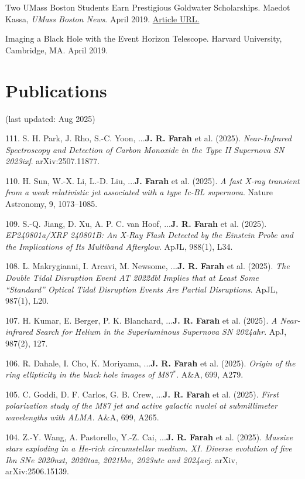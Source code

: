\documentclass[margin,line]{res}
\begin{document}
\begin{resume}
Two UMass Boston Students Earn Prestigious Goldwater Scholarships. Maedot Kassa, \textit{UMass Boston News}. April 2019. {\color{blue}\href{https://www.umb.edu/news/detail/two_umass_boston_students_earn_prestigious_goldwater_scholarships}{Article URL.}}


Imaging a Black Hole with the Event Horizon Telescope. Harvard University, Cambridge, MA. April
2019.




\vspace{+.4cm}
\section{\sc Publications} 
\label{sec:publications}

(last updated: Aug 2025)

111. S. H. Park, J. Rho, S.-C. Yoon, ...\textbf{J. R. Farah} et al. (2025). \textit{Near-Infrared Spectroscopy and Detection of Carbon Monoxide in the Type II Supernova SN 2023ixf}. arXiv:2507.11877.

110. H. Sun, W.-X. Li, L.-D. Liu, ...\textbf{J. Farah} et al. (2025). \textit{A fast X-ray transient from a weak relativistic jet associated with a type Ic-BL supernova}. Nature Astronomy, 9, 1073–1085.

109. S.-Q. Jiang, D. Xu, A. P. C. van Hoof, ...\textbf{J. R. Farah} et al. (2025). \textit{EP240801a/XRF 240801B: An X-Ray Flash Detected by the Einstein Probe and the Implications of Its Multiband Afterglow}. ApJL, 988(1), L34.

108. L. Makrygianni, I. Arcavi, M. Newsome, ...\textbf{J. R. Farah} et al. (2025). \textit{The Double Tidal Disruption Event AT 2022dbl Implies that at Least Some “Standard” Optical Tidal Disruption Events Are Partial Disruptions}. ApJL, 987(1), L20.

107. H. Kumar, E. Berger, P. K. Blanchard, ...\textbf{J. R. Farah} et al. (2025). \textit{A Near-infrared Search for Helium in the Superluminous Supernova SN 2024ahr}. ApJ, 987(2), 127.

106. R. Dahale, I. Cho, K. Moriyama, ...\textbf{J. R. Farah} et al. (2025). \textit{Origin of the ring ellipticity in the black hole images of M87$^{*}$}. A&A, 699, A279.

105. C. Goddi, D. F. Carlos, G. B. Crew, ...\textbf{J. R. Farah} et al. (2025). \textit{First polarization study of the M87 jet and active galactic nuclei at submillimeter wavelengths with ALMA}. A&A, 699, A265.

104. Z.-Y. Wang, A. Pastorello, Y.-Z. Cai, ...\textbf{J. R. Farah} et al. (2025). \textit{Massive stars exploding in a He-rich circumstellar medium. XI. Diverse evolution of five Ibn SNe 2020nxt, 2020taz, 2021bbv, 2023utc and 2024aej}. arXiv, arXiv:2506.15139.


\end{resume}
\end{document}
